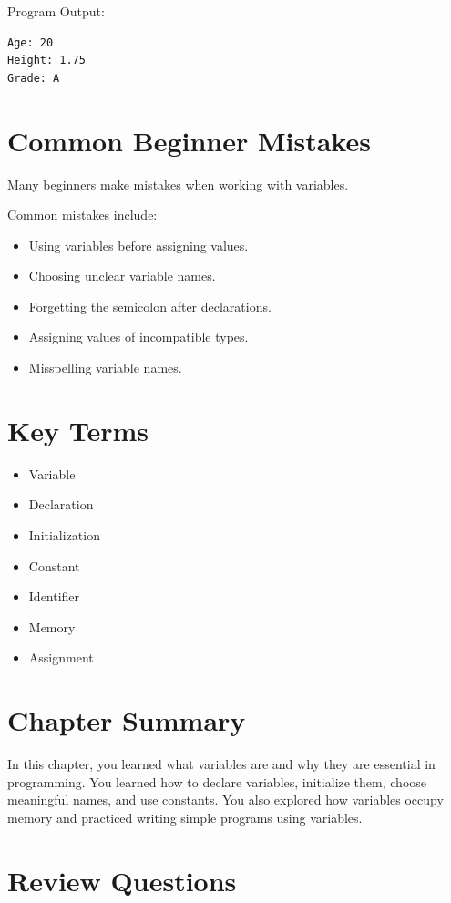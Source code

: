 \documentclass[12pt,openany]{book}
\begin{document}
Program Output:

\begin{lstlisting}
Age: 20
Height: 1.75
Grade: A
\end{lstlisting}

\section{Common Beginner Mistakes}

Many beginners make mistakes when working with variables.

Common mistakes include:

\begin{itemize}
    \item Using variables before assigning values.
    \item Choosing unclear variable names.
    \item Forgetting the semicolon after declarations.
    \item Assigning values of incompatible types.
    \item Misspelling variable names.
\end{itemize}
\section{Key Terms}

\begin{itemize}
    \item Variable
    \item Declaration
    \item Initialization
    \item Constant
    \item Identifier
    \item Memory
    \item Assignment
\end{itemize}

\section{Chapter Summary}

In this chapter, you learned what variables are and why they are essential in programming. You learned how to declare variables, initialize them, choose meaningful names, and use constants. You also explored how variables occupy memory and practiced writing simple programs using variables.

\section{Review Questions}
\end{document}
